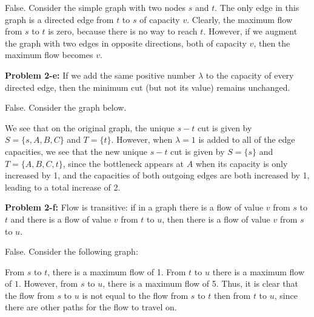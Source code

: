 \documentclass[psamsfonts]{amsart}
\newenvironment{sol}{\vspace{0.25cm}{\large \bfseries Solution:}}{\qedsymbol}
\newenvironment{prob}[1]{\begin{framed}{\large \bfseries Problem #1:}}{\end{framed}}
\begin{document}
\begin{sol}
False. Consider the simple graph with two nodes $s$ and $t$. The only edge in this graph is a directed edge from $t$ to $s$ of capacity $v$. Clearly, the maximum flow from $s$ to $t$ is zero, because there is no way to reach $t$. However, if we augment the graph with two edges in opposite directions, both of capacity $v$, then the maximum flow becomes $v$.
\end{sol}

\begin{prob}{2-e}
If we add the same positive number $\lambda$ to the capacity of every directed edge, then the minimum cut (but not its value) remains unchanged.
\end{prob}

\begin{sol}
False. Consider the graph below. 
\begin{figure}[h!]
\centering
{}
\end{figure}

We see that on the original graph, the unique $s-t$ cut is given by $S = \{s, A, B, C\}$ and $T = \{t\}$. However, when $\lambda = 1$ is added to all of the edge capacities, we see that the new unique $s-t$ cut is given by $S = \{s\}$ and $T = \{A, B, C, t \}$, since the bottleneck appears at $A$ when its capacity is only increased by 1, and the capacities of both outgoing edges are both increased by 1, leading to a total increase of 2. 
\end{sol}

\begin{prob}{2-f}
Flow is transitive: if in a graph there is a flow of value $v$ from $s$ to $t$ and there is a flow of value $v$ from $t$ to $u$, then there is a flow of value $v$ from $s$ to $u$.
\end{prob}
\begin{sol}
False. Consider the following graph:
\begin{figure}[h!]
\centering
{}
\end{figure}

From $s$ to $t$, there is a maximum flow of 1. From $t$ to $u$ there is a maximum flow of $1$. However, from $s$ to $u$, there is a maximum flow of 5. Thus, it is clear that the flow from $s$ to $u$ is not equal to the flow from $s$ to $t$ then from $t$ to $u$, since there are other paths for the flow to travel on. 
\end{sol}
\end{document}
